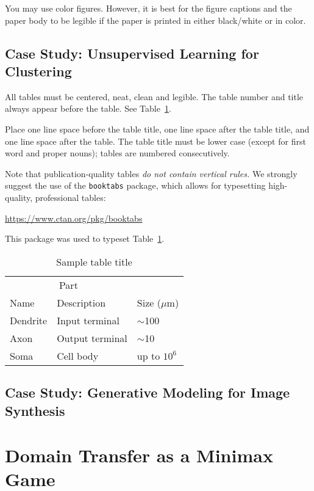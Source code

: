 \documentclass{article}
\begin{document}
You may use color figures.  However, it is best for the figure
captions and the paper body to be legible if the paper is printed in
either black/white or in color.


\subsection{Case Study: Unsupervised Learning for Clustering}

All tables must be centered, neat, clean and legible.  The table
number and title always appear before the table.  See
Table~\ref{sample-table}.

Place one line space before the table title, one line space after the
table title, and one line space after the table. The table title must
be lower case (except for first word and proper nouns); tables are
numbered consecutively.

Note that publication-quality tables \emph{do not contain vertical
  rules.} We strongly suggest the use of the \verb+booktabs+ package,
which allows for typesetting high-quality, professional tables:
\begin{center}
  \url{https://www.ctan.org/pkg/booktabs}
\end{center}
This package was used to typeset Table~\ref{sample-table}.

\begin{table}
  \caption{Sample table title}
  \label{sample-table}
  \centering
  \begin{tabular}{lll}
    \toprule
    \multicolumn{2}{c}{Part}                   \\
    \cmidrule(r){1-2}
    Name     & Description     & Size ($\mu$m) \\
    \midrule
    Dendrite & Input terminal  & $\sim$100     \\
    Axon     & Output terminal & $\sim$10      \\
    Soma     & Cell body       & up to $10^6$  \\
    \bottomrule
  \end{tabular}
\end{table}


\subsection{Case Study: Generative Modeling for Image Synthesis}




\section{Domain Transfer as a Minimax Game}
\label{Sec:ST}
\end{document}
